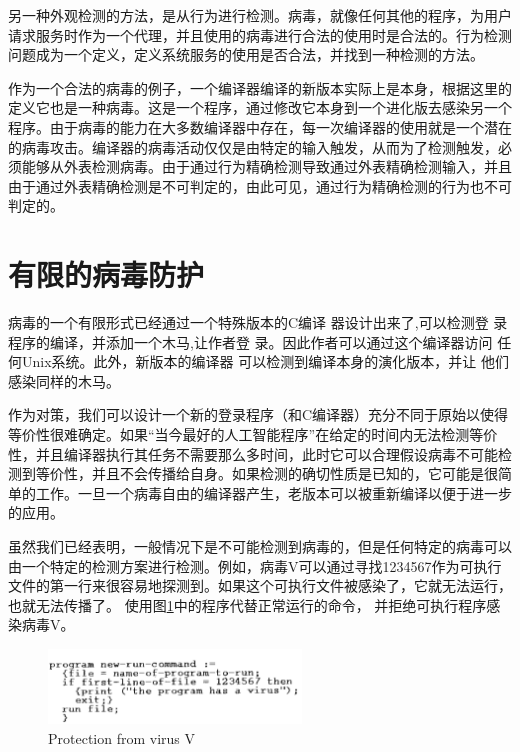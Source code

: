 另一种外观检测的方法，是从行为进行检测。病毒，就像任何其他的程序，为用户请求服务时作为一个代理，并且使用的病毒进行合法的使用时是合法的。行为检测问题成为一个定义，定义系统服务的使用是否合法，并找到一种检测的方法。

作为一个合法的病毒的例子，一个编译器编译的新版本实际上是本身，根据这里的定义它也是一种病毒。这是一个程序，通过修改它本身到一个进化版去感染另一个程序。由于病毒的能力在大多数编译器中存在，每一次编译器的使用就是一个潜在的病毒攻击。编译器的病毒活动仅仅是由特定的输入触发，从而为了检测触发，必须能够从外表检测病毒。由于通过行为精确检测导致通过外表精确检测输入，并且由于通过外表精确检测是不可判定的，由此可见，通过行为精确检测的行为也不可判定的。

\section{有限的病毒防护}

病毒的一个有限形式已经通过一个特殊版本的C编译
器设计出来了,可以检测登
录程序的编译，并添加一个木马,让作者登
录。因此作者可以通过这个编译器访问
任何Unix系统。此外，新版本的编译器
可以检测到编译本身的演化版本，并让
他们感染同样的木马。


作为对策，我们可以设计一个新的登录程序（和C编译器）充分不同于原始以使得等价性很难确定。如果“当今最好的人工智能程序”在给定的时间内无法检测等价性，并且编译器执行其任务不需要那么多时间，此时它可以合理假设病毒不可能检测到等价性，并且不会传播给自身。如果检测的确切性质是已知的，它可能是很简单的工作。一旦一个病毒自由的编译器产生，老版本可以被重新编译以便于进一步的应用。



虽然我们已经表明，一般情况下是不可能检测到病毒的，但是任何特定的病毒可以由一个特定的检测方案进行检测。例如，病毒V可以通过寻找1234567作为可执行文件的第一行来很容易地探测到。如果这个可执行文件被感染了，它就无法运行，也就无法传播了。
使用图\ref{fig9}中的程序代替正常运行的命令，
并拒绝可执行程序感染病毒V。


\begin{figure}[h!]
    \centering
    \includegraphics[width=0.60\textwidth]{figure/fig9.png}
    \caption{Protection from virus V} 
    \label{fig9}
\end{figure} 


